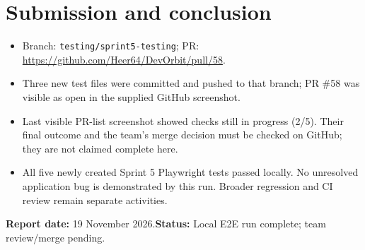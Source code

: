 \documentclass[11pt,a4paper]{article}
\begin{document}
\section{Submission and conclusion}
\begin{itemize}
\item Branch: \texttt{testing/sprint5-testing}; PR: \url{https://github.com/Heer64/DevOrbit/pull/58}.
\item Three new test files were committed and pushed to that branch; PR \#58 was visible as open in the supplied GitHub screenshot.
\item Last visible PR-list screenshot showed checks still in progress (2/5). Their final outcome and the team's merge decision must be checked on GitHub; they are not claimed complete here.
\item All five newly created Sprint 5 Playwright tests passed locally. No unresolved application bug is demonstrated by this run. Broader regression and CI review remain separate activities.
\end{itemize}
\noindent\textbf{Report date:} 19 November 2026.\quad \textbf{Status:} Local E2E run complete; team review/merge pending.
\end{document}
